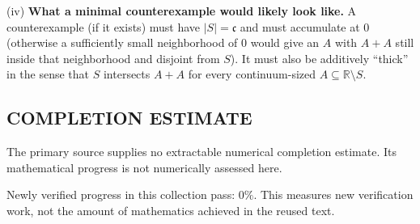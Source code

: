 (iv) \textbf{What a minimal counterexample would likely look like.}
A counterexample (if it exists) must have $|S|=\mathfrak c$ and must accumulate at $0$ (otherwise a sufficiently small neighborhood of $0$ would give an $A$ with $A+A$ still inside that neighborhood and disjoint from $S$). It must also be additively ``thick'' in the sense that $S$ intersects $A+A$ for every continuum-sized $A\subseteq\mathbb R\setminus S$.




\subsection*{COMPLETION ESTIMATE}
The primary source supplies no extractable numerical completion estimate. Its mathematical progress is not numerically assessed here.

Newly verified progress in this collection pass: $0\%$. This measures new verification work, not the amount of mathematics achieved in the reused text.
